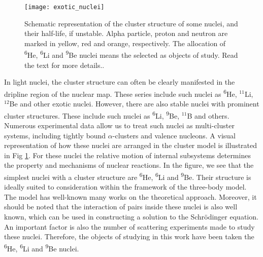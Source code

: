\documentclass[
12pt, %
oneside, %
english, %
onehalfspacing, %
onehalfspacing, %
headsepline, %
]{MastersDoctoralThesis} %
\newcommand{\he}{\textsuperscript{6}He\xspace}
\newcommand{\li}{\textsuperscript{6}Li\xspace}
\newcommand{\be}{\textsuperscript{9}Be\xspace}
\begin{document}
\begin{figure}
\centering
\texttt{[image: exotic\_nuclei]}
\decoRule
\caption{\footnotesize Schematic representation of the cluster structure of some nuclei, and their half-life, if unstable. Alpha particle, proton and neutron are marked in yellow, red and orange, respectively. The allocation of \he, \li and \be nuclei means the selected as objects of study. Read the text for more details..}
\label{fig:exotic_nuclei}
\end{figure}

In light nuclei, the cluster structure can often be clearly manifested in the dripline region of the nuclear map. 
These series include such nuclei as \he, $^{11}$Li, $^{12}$Be and other exotic nuclei. 
However, there are also stable nuclei with prominent cluster structures. These include such nuclei as \li, \be, $ ^{11}$B and others. Numerous experimental data \cite{canto2006fusion, brown2007, papka2007} allow us to treat such nuclei as multi-cluster systems, including tightly bound $\alpha$-clusters and valence nucleons. A visual representation of how these nuclei are arranged in the cluster model is illustrated in Fig \ref{fig:exotic_nuclei}. 
For these nuclei the relative motion of internal subsystems determines the property and mechanisms of nuclear reactions. 
In the figure, we see that the simplest nuclei with a cluster structure are \he, \li and \be. 
Their structure is ideally suited to consideration within the framework of the three-body model. 
The model has well-known many works on the theoretical approach. 
Moreover, it should be noted that the interaction of pairs inside these nuclei is also well known, which can be used in constructing a solution to the Schr\"{o}dinger equation. An important factor is also the number of scattering experiments made to study these nuclei.
Therefore, the objects of studying in this work have been taken the \he, \li and \be nuclei.
\end{document}
